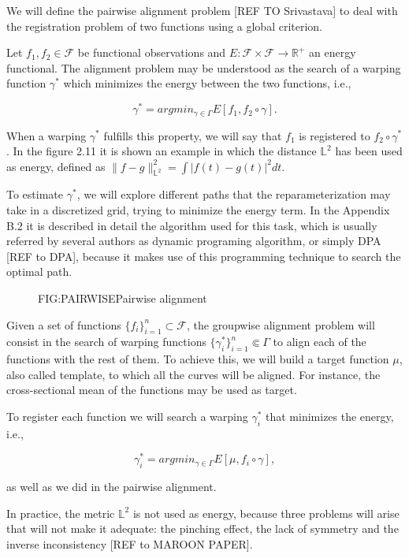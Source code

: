 
We will define the pairwise alignment problem [REF TO Srivastava] to deal with
the registration problem of two functions using a global criterion.

Let $f_1, f_2 \in \mathcal{F}$ be functional observations and
$E: \mathcal{F} \times \mathcal{F} \rightarrow \mathbb{R}^+$ an energy
functional. The alignment problem may be understood as the search of a warping
function $\gamma^*$ which minimizes the energy between the two functions, i.e.,

$$
\gamma^* = argmin_{\gamma \in \Gamma} E[f_1, f_2 \circ \gamma] .
$$

When a warping $\gamma^*$ fulfills this property, we will say that $f_1$ is
registered to $f_2 \circ \gamma^*$. In the figure 2.11 it is shown an example in
 which the distance $\mathbb{L}^2$ has been used as energy, defined as
 $\|f - g\|_{\mathbb{L}^2}^2 = \int |f(t) - g(t)|^2 dt$.

To estimate $\gamma^*$, we will explore different paths that the
reparameterization may take in a discretized grid, trying to minimize the energy
term. In the Appendix B.2 it is described in detail the algorithm used for this
task, which is usually referred by several authors as dynamic programing
algorithm, or simply DPA [REF to DPA], because it makes use of this programming
technique to search the optimal path.

\begin{figure}[Pairwise alignment]{FIG:PAIRWISE}{Pairwise alignment}
   \quad
\end{figure}

Given a set of functions $\{f_i\}_{i=1}^n \subset \mathcal{F}$, the
groupwise alignment problem will consist in the search of warping functions
$\{\gamma_i^* \}_{i=1}^n \Subset \Gamma$ to align each of the functions with the
rest of them. To achieve this, we will build a target function $\mu$, also
called template, to which all the curves will be aligned. For instance,
the cross-sectional mean of the functions may be used as target.

To register each function we will search a warping $\gamma_i^*$ that minimizes
the energy, i.e.,

$$
\gamma_i^* = argmin_{\gamma \in \Gamma} E[\mu, f_i \circ \gamma],
$$

as well as we did in the pairwise alignment.

In practice, the metric $\mathbb{L}^2$ is not used as energy, because three
problems will arise that will not make it adequate: the pinching effect, the
lack of symmetry and the inverse inconsistency [REF to MAROON PAPER].
